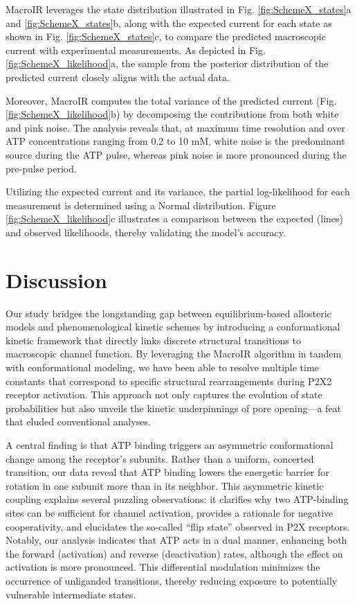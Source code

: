 \documentclass[pdflatex,sn-nature]{sn-jnl}%
\theoremstyle{thmstyleone}%
\theoremstyle{thmstyletwo}%
\theoremstyle{thmstylethree}%
\begin{document}
MacroIR leverages the state distribution illustrated in Fig. \ref{fig:SchemeX_states}a and \ref{fig:SchemeX_states}b, along with the expected current for each state as shown in Fig. \ref{fig:SchemeX_states}c, to compare the predicted macroscopic current with experimental measurements. As depicted in Fig. \ref{fig:SchemeX_likelihood}a, the sample from the posterior distribution of the predicted current closely aligns with the actual data. 

Moreover, MacroIR computes the total variance of the predicted current (Fig. \ref{fig:SchemeX_likelihood}b) by decomposing the contributions from both white and pink noise. The analysis reveals that, at maximum time resolution and over ATP concentrations ranging from 0.2 to 10 mM, white noise is the predominant source during the ATP pulse, whereas pink noise is more pronounced during the pre-pulse period.

Utilizing the expected current and its variance, the partial log-likelihood for each measurement is determined using a Normal distribution. Figure \ref{fig:SchemeX_likelihood}c illustrates a comparison between the expected (lines) and observed likelihoods, thereby validating the model's accuracy.


\section{Discussion}

Our study bridges the longstanding gap between equilibrium-based allosteric models and phenomenological kinetic schemes by introducing a conformational kinetic framework that directly links discrete structural transitions to macroscopic channel function. By leveraging the MacroIR algorithm in tandem with conformational modeling, we have been able to resolve multiple time constants that correspond to specific structural rearrangements during P2X2 receptor activation. This approach not only captures the evolution of state probabilities but also unveils the kinetic underpinnings of pore opening—a feat that eluded conventional analyses.

A central finding is that ATP binding triggers an asymmetric conformational change among the receptor’s subunits. Rather than a uniform, concerted transition, our data reveal that ATP binding lowers the energetic barrier for rotation in one subunit more than in its neighbor. This asymmetric kinetic coupling explains several puzzling observations: it clarifies why two ATP-binding sites can be sufficient for channel activation, provides a rationale for negative cooperativity, and elucidates the so-called “flip state” observed in P2X receptors. Notably, our analysis indicates that ATP acts in a dual manner, enhancing both the forward (activation) and reverse (deactivation) rates, although the effect on activation is more pronounced. This differential modulation minimizes the occurrence of unliganded transitions, thereby reducing exposure to potentially vulnerable intermediate states.
\end{document}
